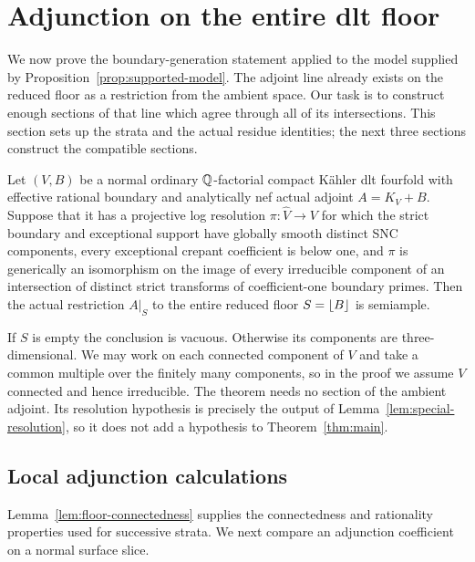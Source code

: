 \section{Adjunction on the entire dlt floor}\label{sec:adjunction}

We now prove the boundary-generation statement applied to the model
supplied by Proposition~\ref{prop:supported-model}.  The adjoint line already exists
on the reduced floor as a restriction from the ambient space.  Our task is
to construct enough sections of that line which agree through all of its
intersections.  This section sets up the strata and the actual residue
identities; the next three sections construct the compatible sections.

\begin{theorem}\label{thm:floor-generation}
Let \((V,B)\) be a normal ordinary \(\mathbb Q\)-factorial compact K\"ahler dlt
fourfold with effective rational boundary and analytically nef actual
adjoint \(A=K_V+B\).  Suppose that it has a projective log resolution
\(\pi:\widehat V\to V\) for which the strict boundary and exceptional
support have globally smooth distinct SNC components, every exceptional
crepant coefficient is below one, and \(\pi\) is generically an
isomorphism on the image of every irreducible component of an intersection
of distinct strict transforms of coefficient-one boundary primes.
Then the actual restriction \(A|_S\) to the entire reduced floor
\(S=\left\lfloor B\right\rfloor\) is semiample.
\end{theorem}

If \(S\) is empty the conclusion is vacuous.  Otherwise its components
are three-dimensional.  We may work on each connected component of \(V\)
and take a common multiple over the finitely many components, so in the
proof we assume \(V\) connected and hence irreducible.  The theorem needs no section of the ambient
adjoint.  Its resolution hypothesis is precisely the output of
Lemma~\ref{lem:special-resolution}, so it does not add a hypothesis to
Theorem~\ref{thm:main}.

\subsection{Local adjunction calculations}

Lemma~\ref{lem:floor-connectedness} supplies the connectedness and
rationality properties used for successive strata.  We next compare an
adjunction coefficient on a normal surface slice.

